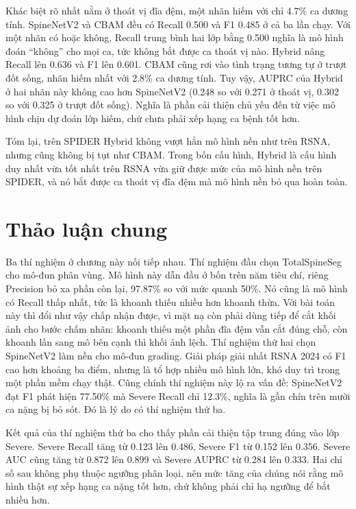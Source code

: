 Khác biệt rõ nhất nằm ở thoát vị đĩa đệm, một nhãn hiếm với chỉ 4.7\% ca dương tính. SpineNetV2 và CBAM đều có Recall 0.500 và F1 0.485 ở cả ba lần chạy. Với một nhãn có hoặc không, Recall trung bình hai lớp bằng 0.500 nghĩa là mô hình đoán ``không'' cho mọi ca, tức không bắt được ca thoát vị nào. Hybrid nâng Recall lên 0.636 và F1 lên 0.601. CBAM cũng rơi vào tình trạng tương tự ở trượt đốt sống, nhãn hiếm nhất với 2.8\% ca dương tính. Tuy vậy, AUPRC của Hybrid ở hai nhãn này không cao hơn SpineNetV2 (0.248 so với 0.271 ở thoát vị, 0.302 so với 0.325 ở trượt đốt sống). Nghĩa là phần cải thiện chủ yếu đến từ việc mô hình chịu dự đoán lớp hiếm, chứ chưa phải xếp hạng ca bệnh tốt hơn.

Tóm lại, trên SPIDER Hybrid không vượt hẳn mô hình nền như trên RSNA, nhưng cũng không bị tụt như CBAM. Trong bốn cấu hình, Hybrid là cấu hình duy nhất vừa tốt nhất trên RSNA vừa giữ được mức của mô hình nền trên SPIDER, và nó bắt được ca thoát vị đĩa đệm mà mô hình nền bỏ qua hoàn toàn.

\FloatBarrier
\section{Thảo luận chung}

Ba thí nghiệm ở chương này nối tiếp nhau. Thí nghiệm đầu chọn TotalSpineSeg cho mô-đun phân vùng. Mô hình này dẫn đầu ở bốn trên năm tiêu chí, riêng Precision bỏ xa phần còn lại, 97.87\% so với mức quanh 50\%. Nó cũng là mô hình có Recall thấp nhất, tức là khoanh thiếu nhiều hơn khoanh thừa. Với bài toán này thì đổi như vậy chấp nhận được, vì mặt nạ còn phải dùng tiếp để cắt khối ảnh cho bước chấm nhãn: khoanh thiếu một phần đĩa đệm vẫn cắt đúng chỗ, còn khoanh lấn sang mô bên cạnh thì khối ảnh lệch. Thí nghiệm thứ hai chọn SpineNetV2 làm nền cho mô-đun grading. Giải pháp giải nhất RSNA 2024 có F1 cao hơn khoảng ba điểm, nhưng là tổ hợp nhiều mô hình lớn, khó duy trì trong một phần mềm chạy thật. Cũng chính thí nghiệm này lộ ra vấn đề: SpineNetV2 đạt F1 phát hiện 77.50\% mà Severe Recall chỉ 12.3\%, nghĩa là gần chín trên mười ca nặng bị bỏ sót. Đó là lý do có thí nghiệm thứ ba.

Kết quả của thí nghiệm thứ ba cho thấy phần cải thiện tập trung đúng vào lớp Severe. Severe Recall tăng từ 0.123 lên 0.486, Severe F1 từ 0.152 lên 0.356. Severe AUC cũng tăng từ 0.872 lên 0.899 và Severe AUPRC từ 0.284 lên 0.333. Hai chỉ số sau không phụ thuộc ngưỡng phân loại, nên mức tăng của chúng nói rằng mô hình thật sự xếp hạng ca nặng tốt hơn, chứ không phải chỉ hạ ngưỡng để bắt nhiều hơn.

